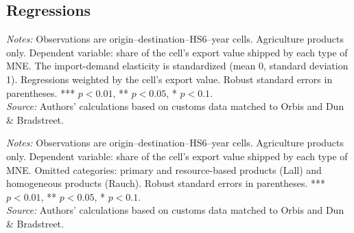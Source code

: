 \documentclass[11pt,a4paper]{article}
\begin{document}
\subsection{Regressions}
\begin{table}[H]\centering\small%
  \caption{Agriculture: Product Characteristics and Multinational Shares}%
  \label{tab:fgo_r_agro}%
  \par\vspace{3pt}%
  \begin{minipage}{0.95\textwidth}\footnotesize %
  \textit{Notes:} Observations are origin--destination--HS6--year cells. Agriculture products only. Dependent variable: share of the cell's export value shipped by each type of MNE. The import-demand elasticity is standardized (mean 0, standard deviation 1). Regressions weighted by the cell's export value. Robust standard errors in parentheses. *** $p<0.01$, ** $p<0.05$, * $p<0.1$.\\[3pt]%
  \textit{Source:} Authors' calculations based on customs data matched to Orbis and Dun \& Bradstreet.%
  \end{minipage}%
  \end{table}
\begin{table}[H]\centering\footnotesize%
  \caption{Agriculture: Product Sophistication and Multinational Shares}%
  \label{tab:meas_r_agro}%
  \par\vspace{3pt}%
  \begin{minipage}{0.95\textwidth}\footnotesize %
  \textit{Notes:} Observations are origin--destination--HS6--year cells. Agriculture products only. Dependent variable: share of the cell's export value shipped by each type of MNE. Omitted categories: primary and resource-based products (Lall) and homogeneous products (Rauch). Robust standard errors in parentheses. *** $p<0.01$, ** $p<0.05$, * $p<0.1$.\\[3pt]%
  \textit{Source:} Authors' calculations based on customs data matched to Orbis and Dun \& Bradstreet.%
  \end{minipage}%
  \end{table}
\end{document}
